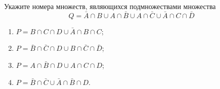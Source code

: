 \question
Укажите номера множеств, являющихся подмножествами множества
\begin{equation*}
	Q = \bar{A} \cap B \cup A \cap \bar{B} \cup A \cap \bar{C} \cup \bar{A} \cap C \cap \bar{D}
\end{equation*}

\begin{enumerate}
	\renewcommand{\labelenumi}{\arabic{enumi})}
	\item $P = B \cap C \cap D \cup \bar{A} \cap B \cap C$;
	\item $P = \bar{B} \cap \bar{C} \cap D \cup B \cap \bar{C} \cap \bar{D}$;
	\item $P = A \cap \bar{B} \cap D \cup A \cap C \cap D$;
	\item $P = \bar{B} \cap \bar{C} \cup \bar{A} \cap \bar{B} \cap D$.
\end{enumerate}
